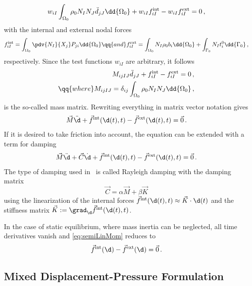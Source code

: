 \begin{equation}
    w_{iI} \int_{\Omega_0} \rho_0 N_I N_J \Ddot{d}_{jJ} \dd{\Omega_0} + w_{iI} f_{iI}^\mathrm{int} - w_{iI} f_{iI}^\mathrm{ext} = 0 \,,
\end{equation}
with the internal and external nodal forces 
\begin{equation}
    f_{iI}^\mathrm{int} = \int_{\Omega_0} \pdv{N_I}{X_j} P_{ji} \dd{\Omega_0} \qq{and}
    f_{iI}^\mathrm{ext} = \int_{\Omega_0} N_I \rho_0 b_i \dd{\Omega_0} + \int_{\Gamma_0} N_I t_i^0  \dd{\Gamma_0} \,,
\end{equation}
respectively.
Since the test functions $w_{iI}$ are arbitrary, it follows 
\begin{align}
    M_{ijIJ} \Ddot{d}_{jJ} + f_{iI}^\mathrm{int} - f_{iI}^\mathrm{ext} = 0 \,, \\
    \qq{where} M_{ijIJ} = \delta_{ij} \int_{\Omega_0} \rho_0 N_I N_J \dd{\Omega_0} \,,
\end{align}
is the so-called mass matrix.
Rewriting everything in matrix vector notation gives
\begin{equation}
    \vec M \Ddot{\d} + \vec f^\mathrm{int}(\d(t),t) - \vec f^\mathrm{ext}(\d(t),t) = \vec 0 \,.
\end{equation}
If it is desired to take friction into account, the equation can be extended with a term for damping
\begin{equation}
    \vec M \Ddot{\d} + \vec C \dot{\d} + \vec f^\mathrm{int}(\d(t),t) - \vec f^\mathrm{ext}(\d(t),t)  = \vec 0 \,. \label{eq:semiLinMom}
\end{equation}
The type of damping used in \CM~is called Rayleigh damping with the damping matrix
\begin{equation}
    \vec C = \alpha \vec M + \beta \vec K
\end{equation}
using the linearization of the internal forces $\vec f^\mathrm{int}(\d(t),t) \approx \vec K \cdot \d(t)$ and the stiffness matrix $\vec K := \grad_{\d}{\vec f^\mathrm{int}(\d(t),t)}$.

In the case of static equilibrium, where mass inertia can be neglected, all time derivatives vanish and \autoref{eq:semiLinMom} reduces to 
\begin{equation}
    \vec f^\mathrm{int}(\d) - \vec f^\mathrm{ext}(\d)  = \vec 0 \,. \label{eq:staticLinMom}
\end{equation}

\subsection{Mixed Displacement-Pressure Formulation}
\label{model:mixed}

